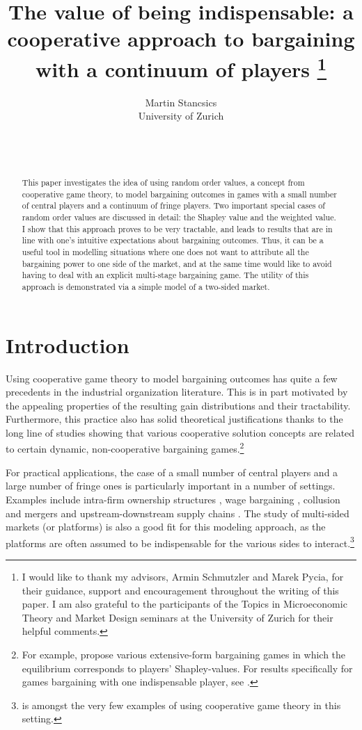 \documentclass[a4paper]{article}
\title{%
    The value of being indispensable: a cooperative approach to bargaining with a continuum of players%
    \thanks{
        I would like to thank my advisors, Armin Schmutzler and Marek Pycia, for their guidance, support and encouragement throughout the writing of this paper.
        I am also grateful to the participants of the Topics in Microeconomic Theory and Market Design seminars at the University of Zurich for their helpful comments.
    }
}
\author{Martin Stancsics \\ \normalsize{University of Zurich}}
\date{\thisdraft \\ \firstdraft \\ \latestversion}
\begin{document}
\maketitle

\begin{abstract}
    This paper investigates the idea of using random order values, a concept from cooperative game theory, to model bargaining outcomes in games with a small number of central players and a continuum of fringe players.
    Two important special cases of random order values are discussed in detail: the Shapley value and the weighted value.
    I show that this approach proves to be very tractable, and leads to results that are in line with one's intuitive expectations about bargaining outcomes.
    Thus, it can be a useful tool in modelling situations where one does not want to attribute all the bargaining power to one side of the market, and at the same time would like to avoid having to deal with an explicit multi-stage bargaining game.
    The utility of this approach is demonstrated via a simple model of a two-sided market.
\end{abstract}


\section{Introduction}

Using cooperative game theory to model bargaining outcomes has quite a few precedents in the industrial organization literature.
This is in part motivated by the appealing properties of the resulting gain distributions and their tractability.
Furthermore, this practice also has solid theoretical justifications thanks to the long line of studies showing that various cooperative solution concepts are related to certain dynamic, non-cooperative bargaining games.\footnote{
    For example, \textcite{gul1989bargaining,winter1994demand,hart1996bargaining,inderst2003bargaining} propose various extensive-form bargaining games in which the equilibrium corresponds to players' Shapley-values.
    For results specifically for games bargaining with one indispensable player, see \textcite{stole1996intra}.
}

For practical applications, the case of a small number of central players and a large number of fringe ones is particularly important in a number of settings.
Examples include intra-firm ownership structures \parencite{hart1990property}, wage bargaining \parencite{stole1996intra,stole1996organizational,levy1997individual}, collusion and mergers \parencite{segal2003collusion} and upstream-downstream supply chains \parencite{inderst2003bargaining,montez2007downstream}.
The study of multi-sided markets (or platforms) is also a good fit for this modeling approach, as the platforms are often assumed to be indispensable for the various sides to interact.\footnote{
    \textcite{huang2022shapley} is amongst the very few examples of using cooperative game theory in this setting.
}
\end{document}
